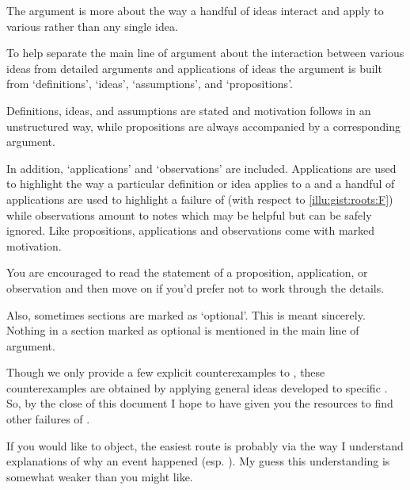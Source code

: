 \begin{note}
  The argument is more about the way a handful of ideas interact and apply to various  rather than any single idea.

  To help separate the main line of argument about the interaction between various ideas from detailed arguments and applications of ideas the argument is built from `definitions', `ideas', `assumptions', and `propositions'.

  Definitions, ideas, and assumptions are stated and motivation follows in an unstructured way, while propositions are always accompanied by a corresponding argument.

  In addition, `applications' and `observations' are included.
  Applications are used to highlight the way a particular definition or idea applies to a \scen{} and a handful of applications are used to highlight a failure of \issueInclusion{} (with respect to \autoref{illu:gist:roots:F}) while observations amount to notes which may be helpful but can be safely ignored.
  Like propositions, applications and observations come with marked motivation.

  You are encouraged to read the statement of a proposition, application, or observation and then move on if you'd prefer not to work through the details.

  Also, sometimes sections are marked as `optional'.
  This is meant sincerely.
  Nothing in a section marked as optional is mentioned in the main line of argument.
\end{note}

\begin{note}
  Though we only provide a few explicit counterexamples to \issueInclusion{}, these counterexamples are obtained by applying general ideas developed to specific .
  So, by the close of this document I hope to have given you the resources to find other failures of \issueInclusion{}.
\end{note}


\begin{note}
  If you would like to object, the easiest route is probably via the way I understand explanations of why an event happened (esp. \progEx{}).
  My guess this understanding is somewhat weaker than you might like.
\end{note}




